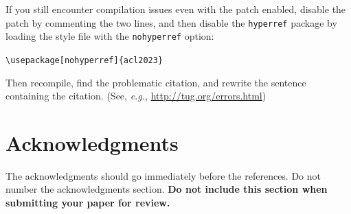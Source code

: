 \documentclass[11pt,a4paper]{article}
\begin{document}
If you still encounter compilation issues even with the patch enabled, disable the patch by commenting the two lines, and then disable the \texttt{\small hyperref} package by loading the style file with the \texttt{\small nohyperref} option:

\noindent
{\small\verb|\usepackage[nohyperref]{acl2023}|}

\noindent
Then recompile, find the problematic citation, and rewrite the sentence containing the citation. (See, {\em e.g.}, \url{http://tug.org/errors.html})

\section*{Acknowledgments}

The acknowledgments should go immediately before the references. Do not number the acknowledgments section.
\textbf{Do not include this section when submitting your paper for review.}




\end{document}

